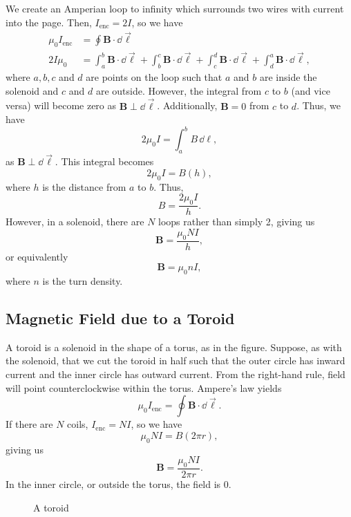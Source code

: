 \documentclass[11pt]{article}
\begin{document}
We create an Amperian loop to infinity which surrounds two wires with current into the page. Then, $I_{\mathrm{enc}} = 2I$, so we have
\begin{align*}
    \mu_0 I_{\mathrm{enc}} &= \oint \mathbf{B} \cdot \dd \vec{\ell} \\
    2I\mu_0 &= \int_{a}^b \mathbf{B} \cdot \dd \vec{\ell} + \int_{b}^c \mathbf{B} \cdot \dd \vec{\ell} + \int_{c}^d \mathbf{B} \cdot \dd \vec{\ell} + \int_{d}^a \mathbf{B} \cdot \dd \vec{\ell},
\end{align*}
where $a,b,c$ and $d$ are points on the loop such that $a$ and $b$ are inside the solenoid and $c$ and $d$ are outside. However, the integral from $c$ to $b$ (and vice versa) will become zero as $\mathbf{B} \perp \dd \vec{\ell}$. Additionally, $\mathbf{B} = 0$ from $c$ to $d$. Thus, we have
\[2\mu_0 I = \int_a^b B\,\dd \ell,\]
as $\mathbf{B} \perp \dd \vec{\ell}$. This integral becomes
\[2\mu_0I = B(h),\]
where $h$ is the distance from $a$ to $b$. Thus,
\[B = \frac{2\mu_0 I}{h}.\]
However, in a solenoid, there are $N$ loops rather than simply 2, giving us
\begin{equation}
    \mathbf{B} = \frac{\mu_0 NI}{h},
\end{equation}
or equivalently
\[\mathbf{B} = \mu_0 n I,\]
where $n$ is the turn density.

\subsection{Magnetic Field due to a Toroid}
A toroid is a solenoid in the shape of a torus, as in the figure. Suppose, as with the solenoid, that we cut the toroid in half such that the outer circle has inward current and the inner circle has outward current. From the right-hand rule, field will point counterclockwise within the torus. Ampere's law yields
\[\mu_0 I_{\mathrm{enc}} = \oint \mathbf{B} \cdot \dd\vec{\ell}.\]
If there are $N$ coils, $I_{\mathrm{enc}} = NI$, so we have
\[\mu_0 NI = B(2\pi r),\]
giving us
\begin{equation}
    \mathbf{B} = \frac{\mu_0 NI}{2\pi r}.
\end{equation}
In the inner circle, or outside the torus, the field is 0.

\begin{figure}[t!]
    \centering
    \caption{A toroid}
\end{figure}
\end{document}
